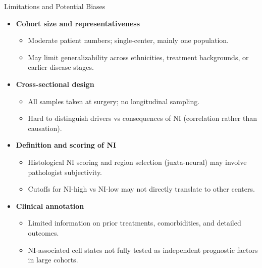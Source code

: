 \documentclass[10pt]{beamer}
\theoremstyle{plain}
\begin{document}
\begin{frame}{Limitations and Potential Biases}
  \begin{itemize}
    \item \textbf{Cohort size and representativeness}
      \begin{itemize}
        \item Moderate patient numbers; single-center, mainly one population.
        \item May limit generalizability across ethnicities, treatment backgrounds, or earlier disease stages.
      \end{itemize}
    \item \textbf{Cross-sectional design}
      \begin{itemize}
        \item All samples taken at surgery; no longitudinal sampling.
        \item Hard to distinguish drivers vs consequences of NI (correlation rather than causation).
      \end{itemize}
    \item \textbf{Definition and scoring of NI}
      \begin{itemize}
        \item Histological NI scoring and region selection (juxta-neural) may involve pathologist subjectivity.
        \item Cutoffs for NI-high vs NI-low may not directly translate to other centers.
      \end{itemize}
    \item \textbf{Clinical annotation}
      \begin{itemize}
        \item Limited information on prior treatments, comorbidities, and detailed outcomes.
        \item NI-associated cell states not fully tested as independent prognostic factors in large cohorts.
      \end{itemize}
  \end{itemize}
\end{frame}
\end{document}
